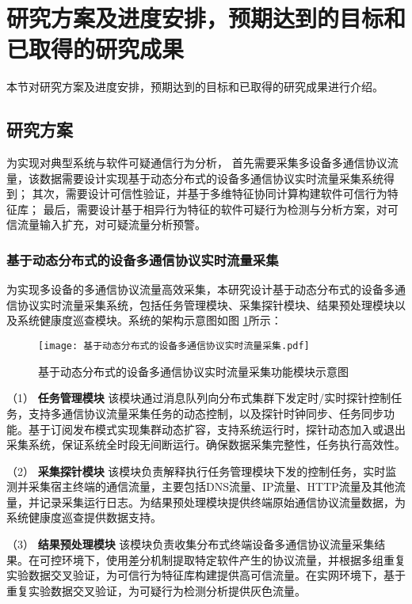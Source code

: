 
\section{研究方案及进度安排，预期达到的目标和已取得的研究成果}
本节对研究方案及进度安排，预期达到的目标和已取得的研究成果进行介绍。
\subsection{研究方案}

为实现对典型系统与软件可疑通信行为分析，
首先需要采集多设备多通信协议流量，该数据需要设计实现基于动态分布式的设备多通信协议实时流量采集系统得到；
其次，需要设计可信性验证，并基于多维特征协同计算构建软件可信行为特征库；
最后，需要设计基于相异行为特征的软件可疑行为检测与分析方案，对可信流量输入扩充，对可疑流量分析预警。


\subsubsection{基于动态分布式的设备多通信协议实时流量采集}

为实现多设备的多通信协议流量高效采集，本研究设计基于动态分布式的设备多通信协议实时流量采集系统，包括任务管理模块、采集探针模块、结果预处理模块以及系统健康度巡查模块。系统的架构示意图如图 \ref{fig:基于动态分布式的设备多通信协议实时流量采集}所示：
\FloatBarrier
 
\begin{figure}[ht]
  \centering
  \texttt{[image: 基于动态分布式的设备多通信协议实时流量采集.pdf]}
  \caption{基于动态分布式的设备多通信协议实时流量采集功能模块示意图}
  \label{fig:基于动态分布式的设备多通信协议实时流量采集}
\end{figure} 

\FloatBarrier

（1） \textbf{任务管理模块}\quad
该模块通过消息队列向分布式集群下发定时/实时探针控制任务，支持多通信协议流量采集任务的动态控制，以及探针时钟同步、任务同步功能。基于订阅发布模式实现集群动态扩容，支持系统运行时，探针动态加入或退出采集系统，保证系统全时段无间断运行。确保数据采集完整性，任务执行高效性。

（2） \textbf{采集探针模块}\quad
该模块负责解释执行任务管理模块下发的控制任务，实时监测并采集宿主终端的通信流量，主要包括DNS流量、IP流量、HTTP流量及其他流量，并记录采集运行日志。为结果预处理模块提供终端原始通信协议流量数据，为系统健康度巡查提供数据支持。

（3） \textbf{结果预处理模块}\quad
该模块负责收集分布式终端设备多通信协议流量采集结果。在可控环境下，使用差分机制提取特定软件产生的协议流量，并根据多组重复实验数据交叉验证，为可信行为特征库构建提供高可信流量。在实网环境下，基于重复实验数据交叉验证，为可疑行为检测分析提供灰色流量。

